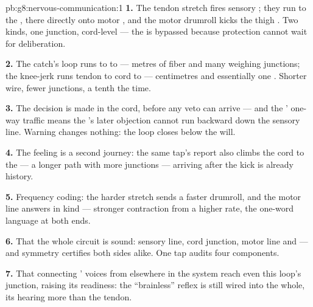 \begin{solution}{pb:g8:nervous-communication:1}
\textbf{1.} The tendon stretch fires sensory ; they
run to the \emph{},  there directly onto
motor , and the motor drumroll kicks the thigh
. Two  kinds, one junction, cord-level ---
the  is bypassed because protection cannot wait for
deliberation.

\textbf{2.} The catch's loop runs  to  to  ---
metres of fiber and many weighing junctions; the knee-jerk
runs tendon to cord to  --- centimetres and
essentially one . Shorter wire, fewer junctions,
a tenth the time.

\textbf{3.} The decision is made in the cord, before any
 veto can arrive --- and the ' one-way
traffic means the 's later objection cannot run
backward down the sensory line. Warning changes nothing:
the loop closes below the will.

\textbf{4.} The feeling is a second journey: the same
tap's report also climbs the cord to the  --- a
longer path with more junctions --- arriving after the
kick is already history.

\textbf{5.} Frequency coding: the harder stretch sends a
faster drumroll, and the motor line answers in kind ---
stronger contraction from a higher rate, the one-word
language at both ends.

\textbf{6.} That the whole circuit is sound: sensory line,
cord junction, motor line and  --- and symmetry
certifies both sides alike. One tap audits four
components.

\textbf{7.} That connecting ' voices from
elsewhere in the system reach even this loop's junction,
raising its readiness: the ``brainless'' reflex is still
wired into the whole, its  hearing more than the
tendon.


\end{solution}
